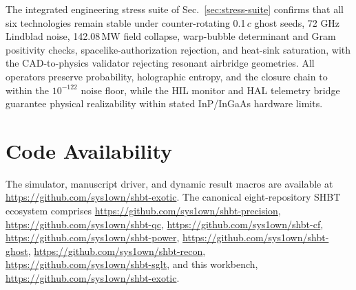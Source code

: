 \documentclass[aps,pra,10pt,onecolumn,superscriptaddress,nofootinbib,longbibliography,floatfix]{revtex4-2}
\begin{document}
The integrated engineering stress suite of Sec.~\ref{sec:stress-suite} confirms that all six technologies remain stable under counter-rotating 0.1\,$c$ ghost seeds, 72 GHz Lindblad noise, 142.08\,MW field collapse, warp-bubble determinant and Gram positivity checks, spacelike-authorization rejection, and heat-sink saturation, with the CAD-to-physics validator rejecting resonant airbridge geometries.  All operators preserve probability, holographic entropy, and the closure chain to within the $10^{-122}$ noise floor, while the HIL monitor and HAL telemetry bridge guarantee physical realizability within stated InP/InGaAs hardware limits.

\section*{Code Availability}

{\raggedright
The simulator, manuscript driver, and dynamic result macros are available at \url{https://github.com/sys1own/shbt-exotic}.  The canonical eight-repository SHBT ecosystem comprises \url{https://github.com/sys1own/shbt-precision}, \url{https://github.com/sys1own/shbt-qc}, \url{https://github.com/sys1own/shbt-cf}, \url{https://github.com/sys1own/shbt-power}, \url{https://github.com/sys1own/shbt-ghost}, \url{https://github.com/sys1own/shbt-recon}, \url{https://github.com/sys1own/shbt-sglt}, and this workbench, \url{https://github.com/sys1own/shbt-exotic}.\par}
\end{document}
